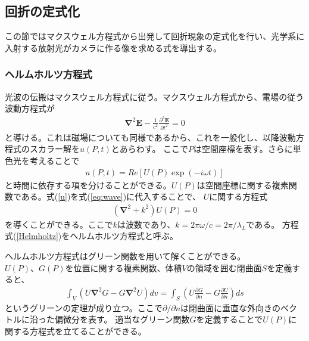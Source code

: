 \documentclass[a4paper,11pt,uplatex]{jsbook}
\begin{document}
\subsection{回折の定式化}\label{sec:rayleigh}
この節ではマクスウェル方程式から出発して回折現象の定式化を行い、光学系に入射する放射光がカメラに作る像を求める式を導出する。

\subsubsection{ヘルムホルツ方程式}
光波の伝搬はマクスウェル方程式に従う。マクスウェル方程式から、電場の従う波動方程式が
\begin{eqnarray}
  \bm{\nabla}^2\bm{E} - \frac{1}{c^2}\frac{\partial^2\bm{E}}{\partial t^2} = 0 \label{eq:wave}
\end{eqnarray}
と導ける。これは磁場についても同様であるから、これを一般化し、以降波動方程式のスカラー解を$u(P,t)$とあらわす。
ここで$P$は空間座標を表す。さらに単色光を考えることで
\begin{eqnarray}
  u(P,t) = Re\left[U(P)\exp (-i\omega t)\right] \label{u}
\end{eqnarray}
と時間に依存する項を分けることができる。$U(P)$は空間座標に関する複素関数である。式(\ref{u})を式(\ref{eq:wave})に代入することで、
$U$に関する方程式
\begin{eqnarray}
  \left(\bm{\nabla}^2 + k^2\right)U(P) = 0 \label{Helmholtz}
\end{eqnarray}
を導くことができる。ここで$k$は波数であり、$k = 2\pi \omega/c = 2\pi/\lambda_L$である。
方程式(\ref{Helmholtz})をヘルムホルツ方程式と呼ぶ。

ヘルムホルツ方程式はグリーン関数を用いて解くことができる。
$U(P)、G(P)$を位置に関する複素関数、体積$V$の領域を囲む閉曲面$S$を定義すると、
\begin{eqnarray}
  \int_V \left(U\bm{\nabla}^2G - G\bm{\nabla}^2U\right) dv = \int_S \left( U\frac{\partial G}{\partial n} - G\frac{\partial U}{\partial n}\right) ds \label{green}
\end{eqnarray}
というグリーンの定理が成り立つ。ここで$\partial/\partial n$は閉曲面に垂直な外向きのベクトルに沿った偏微分を表す。
適当なグリーン関数$G$を定義することで$U(P)$に関する方程式を立てることができる。
\end{document}
